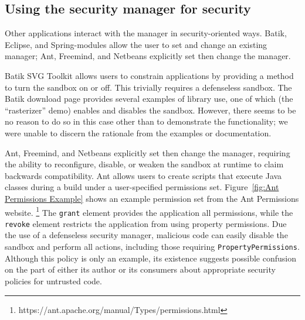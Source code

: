 \documentclass{sig-alternate-05-2015}
\begin{document}
\subsection{Using the security manager for security}
\label{sub:Using-the-Security}

Other applications interact with the manager in
security-oriented ways. %
Batik,
Eclipse, and Spring-modules
allow the user to set and change an existing manager;
Ant, Freemind, and Netbeans explicitly set then change the manager.

Batik SVG Toolkit allows users to constrain applications
by providing a method to turn the sandbox on or off. 
This trivially
requires a defenseless sandbox. The Batik download page
provides several examples of library use, one of which (the
``rasterizer'' demo) enables and disables the sandbox.  However, there seems to
be no reason to do so in this case other than to demonstrate the functionality;
we were unable to discern the rationale from the examples or
documentation.


Ant, Freemind, and Netbeans explicitly set then change the manager,
requiring the ability to reconfigure, disable,
or weaken the sandbox at runtime to claim backwards
compatibility. Ant allows users to create scripts that 
execute Java classes during a build under a user-specified
permissions set. Figure~\ref{fig:Ant Permissions Example}
shows an example permission set from the Ant Permissions website.%
\footnote{https://ant.apache.org/manual/Types/permissions.html%
} The \texttt{grant} element provides the application
all permissions, while the \texttt{revoke} element restricts
the application from using property permissions. Due the use of a
defenseless security manager, malicious code can easily disable the sandbox and perform all actions,
including those requiring \texttt{PropertyPermissions}.  Although this policy is
only an example, its existence suggests possible confusion on the part of either its author
or its consumers about appropriate security policies for untrusted code.
\end{document}

